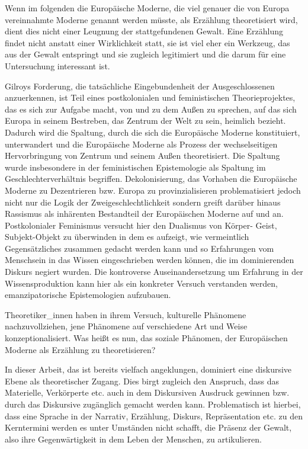 Wenn im folgenden die Europäische Moderne, die viel genauer die von Europa
vereinnahmte Moderne genannt werden müsste, als Erzählung theoretisiert wird,
dient dies nicht einer Leugnung der stattgefundenen Gewalt. Eine Erzählung
findet nicht anstatt einer Wirklichkeit statt, sie ist viel eher ein Werkzeug,
das aus der Gewalt entspringt und sie zugleich legitimiert und die darum für
eine Untersuchung interessant ist.\footnotemark {} 

Gilroys Forderung, die tatsächliche Eingebundenheit der Ausgeschlossenen
anzuerkennen, ist Teil eines postkolonialen und feministischen
Theorieprojektes, das es sich zur Aufgabe macht, von und zu dem Außen zu
sprechen, auf das sich Europa in seinem Bestreben, das Zentrum der Welt zu
sein, heimlich bezieht. Dadurch wird die Spaltung, durch die sich die
Europäische Moderne konstituiert, unterwandert und die Europäische Moderne als
Prozess der wechselseitigen Hervorbringung von Zentrum und seinem Außen
theoretisiert. Die Spaltung wurde insbesondere in der feministischen
Epistemologie als Spaltung im Geschlechterverhältnis begriffen.
Dekolonisierung, das Vorhaben die  Europäische Moderne zu Dezentrieren bzw.
Europa zu \glqq provinzialisieren \grqq \footnotemark
{} problematisiert jedoch nicht nur die Logik der
Zweigeschlechtlichkeit sondern greift darüber hinaus Rassismus als inhärenten
Bestandteil der Europäischen Moderne auf und an. Postkolonialer Feminismus
versucht hier den Dualismus von Körper- Geist, Subjekt-Objekt zu überwinden in
dem es aufzeigt, wie vermeintlich Gegensätzliches zusammen gedacht werden kann
und so Erfahrungen vom Menschsein in das Wissen eingeschrieben werden können,
die im dominierenden Diskurs negiert wurden. Die kontroverse Auseinandersetzung
um Erfahrung in der Wissensproduktion kann hier als ein konkreter Versuch
verstanden werden, emanzipatorische Epistemologien aufzubauen.

Theoretiker\_innen haben in ihrem Versuch, kulturelle Phänomene
nachzuvollziehen, jene Phänomene auf verschiedene Art und Weise
konzeptionalisiert. Was heißt es nun, das soziale Phänomen, der Europäischen
Moderne als Erzählung zu theoretisieren?

In dieser Arbeit, das ist bereits vielfach angeklungen, dominiert eine
diskursive Ebene als theoretischer Zugang. Dies birgt zugleich den Anspruch,
dass das Materielle, Verkörperte etc. auch in dem Diskursiven Ausdruck gewinnen
bzw. durch das Diskursive zugänglich gemacht werden kann. Problematisch ist
hierbei, dass eine Sprache in der Narrativ, Erzählung, Diskurs, Repräsentation
etc. zu den Kerntermini werden es unter Umständen nicht schafft, die Präsenz
der Gewalt, also ihre Gegenwärtigkeit in dem Leben der Menschen, zu
artikulieren.

